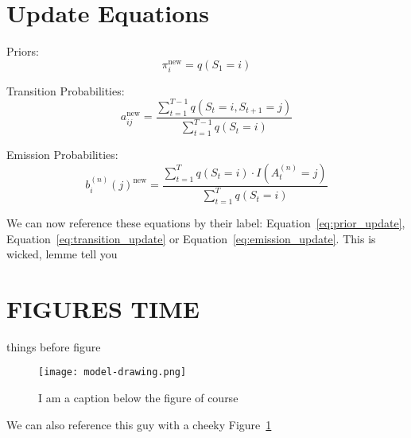 \newpage

\section{Update Equations}
Priors:
\begin{equation}
\pi_i^{\text{new}} = q(S_1=i)
\label{eq:prior_update}
\end{equation}

Transition Probabilities:
\begin{equation}
a_{ij}^{\text{new}} = \frac{\sum\limits_{t=1}^{T - 1} q(S_t=i,S_{t+1}=j)}{\sum\limits_{t=1}^{T-1} q(S_t=i)}
\label{eq:transition_update}
\end{equation}


Emission Probabilities:
\begin{equation}
b_i^{(n)}(j)^{\text{new}} = \frac{\sum\limits_{t=1}^T q(S_t = i) \cdot I(A_t^{(n)} = j)}{\sum\limits_{t=1}^T q(S_t = i)}
\label{eq:emission_update}
\end{equation}

We can now reference these equations by their label: Equation~\ref{eq:prior_update}, Equation~\ref{eq:transition_update} or Equation~\ref{eq:emission_update}. This is wicked, lemme tell you

\newpage

\section{FIGURES TIME}

things before figure

\begin{figure}[!h]
    \centering
    \texttt{[image: model-drawing.png]}
    \caption[I am the short caption that appears in the list of figures, without references.]{ I am a caption below the figure of course}
    \label{fig:model-drawing}
\end{figure}

We can also reference this guy with a cheeky Figure~\ref{fig:model-drawing}

